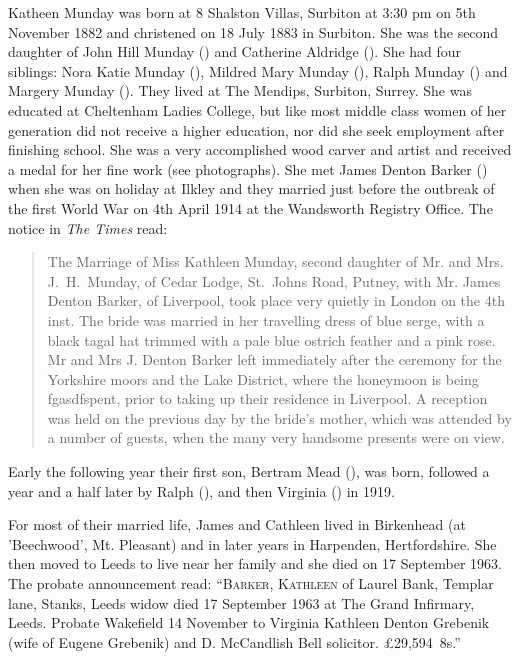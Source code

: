 
Katheen Munday was born at 8 Shalston Villas, Surbiton at 3:30 pm on 5th November 1882\cite{JHMtree, KMbirthCert, JHMbible} and christened on 18 July 1883 in Surbiton. She was the second daughter of John Hill Munday () and Catherine Aldridge (). She had four siblings: Nora Katie Munday (), Mildred Mary Munday (), Ralph Munday () and Margery Munday (). They lived at The Mendips, Surbiton, Surrey.  She was educated at Cheltenham Ladies College, but like most middle class women of her generation did not receive a higher education, nor did she seek employment after finishing school. She was a very accomplished wood carver and artist and received a medal for her fine work (see photographs). She met James Denton Barker () when she was on holiday at Ilkley and they married just before the outbreak of the first World War on 4th April 1914 at the Wandsworth Registry Office.\cite{KathleenJamesWeddingIndex} The notice in \emph{The Times} read:

\begin{quotation}
The Marriage of Miss Kathleen Munday, second daughter of Mr. and Mrs. J.\ H.\ Munday, of Cedar Lodge, St.\ Johns Road, Putney, with Mr. James Denton Barker, of Liverpool, took place very quietly in London on the 4th inst. The bride was married in her travelling dress of blue serge, with a black tagal hat trimmed with a pale blue ostrich feather and a pink rose. Mr and Mrs J. Denton Barker left immediately after the ceremony for the Yorkshire moors and the Lake District, where the honeymoon is being fgasdfspent, prior to taking up their residence in Liverpool. A reception was held on the previous day by the bride's mother, which was attended by a number of guests, when the many very handsome presents were on view.
\end{quotation}

Early the following year their first son, Bertram Mead (), was born, followed a year and a half later by Ralph (), and then Virginia () in 1919.

For most of their married life, James and Cathleen lived in Birkenhead (at 'Beechwood', Mt. Pleasant) and in later years in Harpenden, Hertfordshire. She then moved to Leeds to live near her family and she died on 17 September 1963. The probate announcement read: ``\textsc{Barker, Kathleen} of Laurel Bank, Templar lane, Stanks, Leeds widow died 17 September 1963 at The Grand Infirmary, Leeds. Probate Wakefield 14 November to Virginia Kathleen Denton Grebenik (wife of Eugene Grebenik) and D. McCandlish Bell solicitor. \pounds29,594~8s.''

